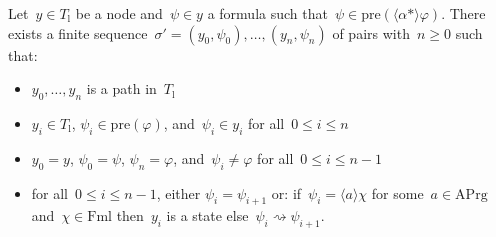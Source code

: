 \documentclass{entcs}
\newcommand{\pea}[2]{\langle#1\rangle #2}
\newcommand{\prp}[1]{#1*}
\newcommand{\fml}{\mathrm{Fml}}
\newcommand{\act}{\mathrm{APrg}}
\newcommand{\ppre}[1]{\mathrm{pre}(#1)}
\newcommand{\pzz}{\mathrel{\rightsquigarrow}}
\newcommand{\tl}{T_{\mathrm{l}}}
\newcommand{\fchn}{\sigma}
\begin{document}
\begin{lemma}
  \label{lem_ex_fulfilling}
  Let~$y \in \tl$ be a node and~$\psi \in y$ a formula such that~$\psi \in \ppre{\pea{\prp{\alpha}}{\varphi}}$.
  There exists a finite sequence~$\fchn' = (y_0, \psi_0), \dotsc, (y_n, \psi_n)$ of pairs with~$n \geq 0$ such that:
  \begin{itemize}
  \item $y_0, \dotsc, y_n$ is a path in~$\tl$
  \item $y_i \in \tl$, $\psi_i \in \ppre{\varphi}$, and~$\psi_i \in y_i$ for all~$0 \leq i \leq n$
  \item $y_0 = y$, $\psi_0 = \psi$, $\psi_n = \varphi$, and~$\psi_i \neq \varphi$ for all~$0 \leq i \leq n-1$
  \item for all~$0 \leq i \leq n-1$, either $\psi_i = \psi_{i+1}$ or:
    if~$\psi_i = \pea{a}{\chi}$ for some~$a \in \act$ and~$\chi \in \fml$
    then~$y_i$ is a state else~$\psi_i \pzz \psi_{i+1}$.
  \end{itemize}
\end{lemma}
\end{document}
